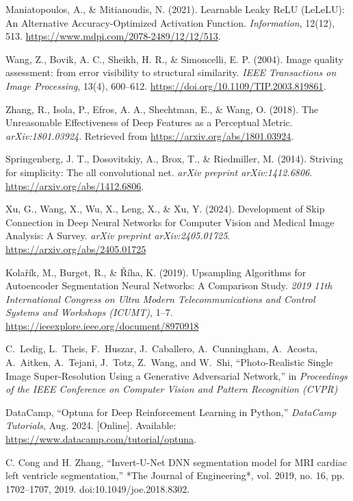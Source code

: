 \documentclass[twocolumn]{article}
\begin{document}
\begin{thebibliography}{99}
     Maniatopoulos, A., \& Mitianoudis, N. (2021). Learnable Leaky ReLU (LeLeLU): An Alternative Accuracy-Optimized Activation Function. \textit{Information}, 12(12), 513. \url{https://www.mdpi.com/2078-2489/12/12/513}.
    
     Wang, Z., Bovik, A. C., Sheikh, H. R., \& Simoncelli, E. P. (2004). Image quality assessment: from error visibility to structural similarity. \textit{IEEE Transactions on Image Processing}, 13(4), 600–612. \url{https://doi.org/10.1109/TIP.2003.819861}.
    
     Zhang, R., Isola, P., Efros, A. A., Shechtman, E., \& Wang, O. (2018). The Unreasonable Effectiveness of Deep Features as a Perceptual Metric. \textit{arXiv:1801.03924}. Retrieved from \url{https://arxiv.org/abs/1801.03924}.

     Springenberg, J. T., Dosovitskiy, A., Brox, T., \& Riedmiller, M. (2014). Striving for simplicity: The all convolutional net. \textit{arXiv preprint arXiv:1412.6806}. \url{https://arxiv.org/abs/1412.6806}.
  
     Xu, G., Wang, X., Wu, X., Leng, X., \& Xu, Y. (2024). Development of Skip Connection in Deep Neural Networks for Computer Vision and Medical Image Analysis: A Survey. \textit{arXiv preprint arXiv:2405.01725}. \url{https://arxiv.org/abs/2405.01725}

     Kolařík, M., Burget, R., \& Říha, K. (2019). Upsampling Algorithms for Autoencoder Segmentation Neural Networks: A Comparison Study. \textit{2019 11th International Congress on Ultra Modern Telecommunications and Control Systems and Workshops (ICUMT)}, 1–7. \url{https://ieeexplore.ieee.org/document/8970918}

     C.~Ledig, L.~Theis, F.~Huszar, J.~Caballero, A.~Cunningham, A.~Acosta, A.~Aitken, A.~Tejani, J.~Totz, Z.~Wang, and W.~Shi, ``Photo-Realistic Single Image Super-Resolution Using a Generative Adversarial Network,'' in \emph{Proceedings of the IEEE Conference on Computer Vision and Pattern Recognition (CVPR)}

     DataCamp, ``Optuna for Deep Reinforcement Learning in Python,'' \textit{DataCamp Tutorials}, Aug. 2024. [Online]. Available: \url{https://www.datacamp.com/tutorial/optuna}.

     C. Cong and H. Zhang, ``Invert-U-Net DNN segmentation model for MRI cardiac left ventricle segmentation,'' *The Journal of Engineering*, vol. 2019, no. 16, pp. 1702–1707, 2019. doi:10.1049/joe.2018.8302.


  \end{thebibliography}
\end{document}
